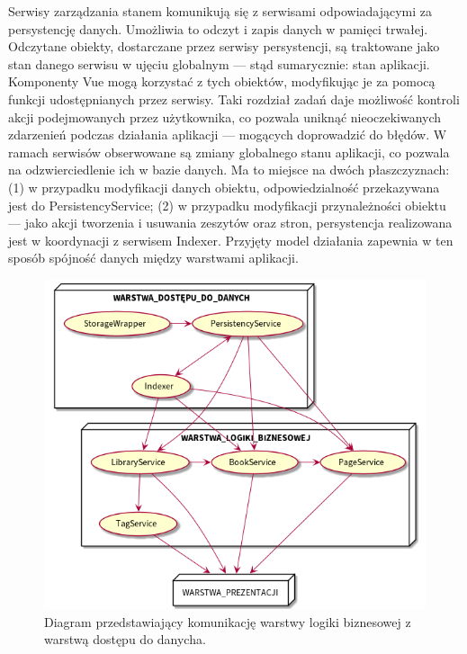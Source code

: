 Serwisy zarządzania stanem komunikują się z serwisami odpowiadającymi za persystencję danych.
Umożliwia to odczyt i zapis danych w pamięci trwałej. Odczytane obiekty, dostarczane przez serwisy persystencji,
są traktowane jako stan danego serwisu w ujęciu globalnym — stąd sumarycznie: stan aplikacji.
Komponenty Vue mogą korzystać z tych obiektów, modyfikując je za pomocą funkcji udostępnianych przez serwisy.
Taki rozdział zadań daje możliwość kontroli akcji podejmowanych przez użytkownika, co pozwala uniknąć nieoczekiwanych
zdarzenień podczas działania aplikacji — mogących doprowadzić do błędów.
W ramach serwisów obserwowane są zmiany globalnego stanu aplikacji, co pozwala na odzwierciedlenie ich w bazie danych.
Ma to miejsce na dwóch płaszczyznach: (1) w przypadku modyfikacji danych obiektu,
odpowiedzialność przekazywana jest do PersistencyService; (2) w przypadku modyfikacji przynależności obiektu — jako akcji
tworzenia i usuwania zeszytów oraz stron, persystencja realizowana jest w koordynacji z serwisem Indexer.
Przyjęty model działania zapewnia w ten sposób spójność danych między warstwami aplikacji.
\begin{figure}[H]
	\begin{center}
		\includegraphics[scale=0.5]{media/LayerComunication.png}
	\end{center}
	\caption{Diagram przedstawiający komunikację warstwy logiki biznesowej z warstwą dostępu do danycha.}
	\label{rys:layer-communication}
\end{figure}

